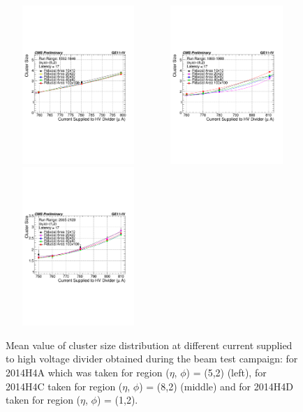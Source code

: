 \begin{figure}[!htbp]
    \begin{center}
      \includegraphics[width=5.5cm,height=6cm]{figures/GEM/CurrentvsClusterSizeR1592R1646.pdf}%
      \includegraphics[width=5.5cm,height=6cm]{figures/GEM/CurrentvsClusterSizeR1869R1903.pdf}%
      \includegraphics[width=5.5cm,height=6cm]{figures/GEM/CurrentvsClusterSizeR2065R2123.pdf}
    \end{center}
    \caption{Mean value of cluster size distribution at different current supplied to high voltage divider obtained during the beam test campaign: for 2014H4A which was taken for region ($\eta$, $\phi$) = (5,2) (left), for 2014H4C taken for region ($\eta$, $\phi$) = (8,2) (middle) and for 2014H4D taken for region ($\eta$, $\phi$) = (1,2).}
  \label{fig:CSDfiducialregion}
\end{figure}
